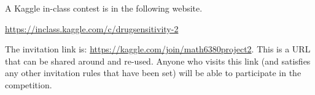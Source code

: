 \documentclass[11pt]{article}
\begin{document}
A Kaggle in-class contest is in the following website. 
\begin{center}
\url{https://inclass.kaggle.com/c/drugsensitivity-2}
\end{center}
The invitation link is: \url{https://kaggle.com/join/math6380project2}. This is a URL that can be shared around and re-used.
Anyone who visits this link (and satisfies any other invitation rules that have been set)
will be able to participate in the competition.
%
%
%
%
%
%
%
%
\end{document}
